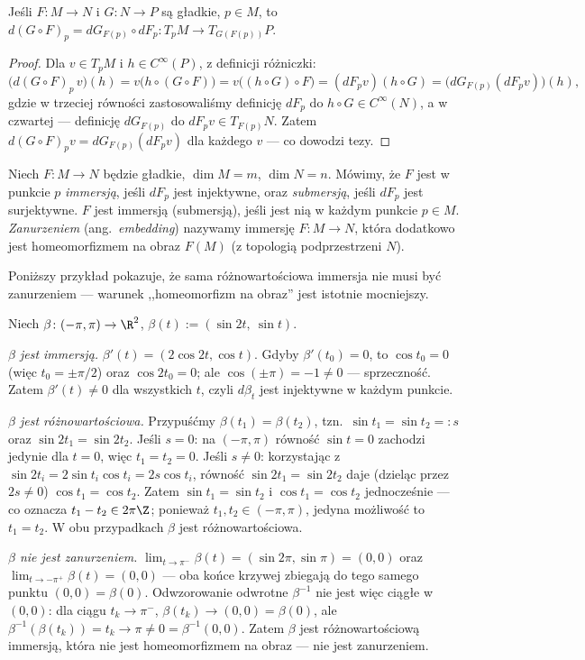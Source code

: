\begin{twierdzenie}
Jeśli $F\colon M\to N$ i $G\colon N\to P$ są gładkie, $p\in M$, to
$d(G\circ F)_p=dG_{F(p)}\circ dF_p\colon T_pM\to T_{G(F(p))}P$.
\end{twierdzenie}
\begin{proof}
Dla $v\in T_pM$ i $h\in C^\infty(P)$, z definicji różniczki:
\[
\big(d(G\circ F)_p\,v\big)(h)=v\big(h\circ(G\circ F)\big)=v\big((h\circ G)\circ F\big)=
(dF_pv)(h\circ G)=\big(dG_{F(p)}(dF_pv)\big)(h),
\]
gdzie w trzeciej równości zastosowaliśmy definicję $dF_p$ do $h\circ G\in C^\infty(N)$, a
w czwartej — definicję $dG_{F(p)}$ do $dF_pv\in T_{F(p)}N$. Zatem $d(G\circ F)_pv=
dG_{F(p)}(dF_pv)$ dla każdego $v$ — co dowodzi tezy.
\end{proof}


\begin{definicja}
Niech $F\colon M\to N$ będzie gładkie, $\dim M=m$, $\dim N=n$. Mówimy, że $F$ jest w
punkcie $p$ \emph{immersją}, jeśli $dF_p$ jest injektywne, oraz \emph{submersją}, jeśli
$dF_p$ jest surjektywne. $F$ jest immersją (submersją), jeśli jest nią w każdym punkcie
$p\in M$. \emph{Zanurzeniem} (ang.\ \emph{embedding}) nazywamy immersję $F\colon M\to N$,
która dodatkowo jest homeomorfizmem na obraz $F(M)$ (z topologią podprzestrzeni $N$).
\end{definicja}

Poniższy przykład pokazuje, że sama różnowartościowa immersja nie musi być zanurzeniem —
warunek ,,homeomorfizm na obraz'' jest istotnie mocniejszy.

\begin{przyklad}\label{prz:osemka}
Niech $\beta\colon(-\pi,\pi)\to\R^2$, $\beta(t):=(\sin2t,\ \sin t)$.

\emph{$\beta$ jest immersją.} $\beta'(t)=(2\cos2t,\cos t)$. Gdyby $\beta'(t_0)=0$, to
$\cos t_0=0$ (więc $t_0=\pm\pi/2$) oraz $\cos2t_0=0$; ale $\cos(\pm\pi)=-1\neq0$ —
sprzeczność. Zatem $\beta'(t)\neq0$ dla wszystkich $t$, czyli $d\beta_t$ jest injektywne w
każdym punkcie.

\emph{$\beta$ jest różnowartościowa.} Przypuśćmy $\beta(t_1)=\beta(t_2)$, tzn.\ $\sin t_1=
\sin t_2=:s$ oraz $\sin2t_1=\sin2t_2$. Jeśli $s=0$: na $(-\pi,\pi)$ równość $\sin t=0$
zachodzi jedynie dla $t=0$, więc $t_1=t_2=0$. Jeśli $s\neq0$: korzystając z $\sin2t_i=
2\sin t_i\cos t_i=2s\cos t_i$, równość $\sin2t_1=\sin2t_2$ daje (dzieląc przez $2s\neq0$)
$\cos t_1=\cos t_2$. Zatem $\sin t_1=\sin t_2$ i $\cos t_1=\cos t_2$ jednocześnie — co
oznacza $t_1-t_2\in2\pi\Z$; ponieważ $t_1,t_2\in(-\pi,\pi)$, jedyna możliwość to $t_1=t_2$.
W obu przypadkach $\beta$ jest różnowartościowa.

\emph{$\beta$ nie jest zanurzeniem.} $\lim_{t\to\pi^-}\beta(t)=(\sin2\pi,\sin\pi)=(0,0)$
oraz $\lim_{t\to-\pi^+}\beta(t)=(0,0)$ — oba końce krzywej zbiegają do tego samego punktu
$(0,0)=\beta(0)$. Odwzorowanie odwrotne $\beta^{-1}$ nie jest więc ciągłe w $(0,0)$: dla
ciągu $t_k\to\pi^-$, $\beta(t_k)\to(0,0)=\beta(0)$, ale $\beta^{-1}(\beta(t_k))=t_k\to\pi
\neq0=\beta^{-1}(0,0)$. Zatem $\beta$ jest różnowartościową immersją, która nie jest
homeomorfizmem na obraz — nie jest zanurzeniem.
\end{przyklad}

